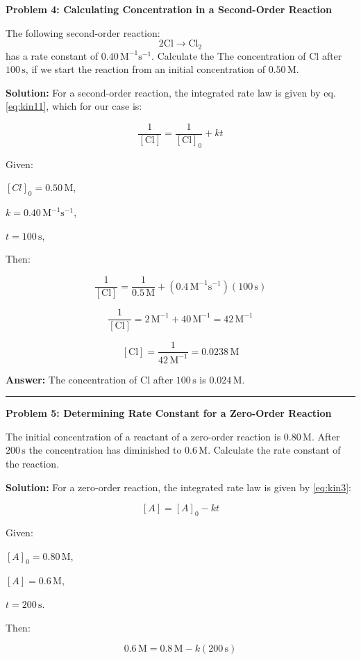 \documentclass[
  9pt,
]{extbook}
\theoremstyle{definition}
\theoremstyle{definition}
\theoremstyle{definition}
\theoremstyle{definition}
\theoremstyle{remark}
\begin{document}
\textbf{Problem 4: Calculating Concentration in a Second-Order Reaction}

The following second-order reaction:
\[2\text{Cl} \rightarrow \text{Cl}_2\]
has a rate constant of \(0.40\,\text{M}^{-1}\text{s}^{-1}\). Calculate the The concentration of \(\text{Cl}\) after \(100\,\text{s}\), if we start the reaction from an initial concentration of \(0.50\,\text{M}\).

\textbf{Solution:} For a second-order reaction, the integrated rate law is given by eq. \eqref{eq:kin11}, which for our case is:

\[\frac{1}{[\text{Cl}]} = \frac{1}{[\text{Cl}]_0} + kt\]

Given:

\([Cl]_0 = 0.50\,\text{M}\),

\(k = 0.40\,\text{M}^{-1}\text{s}^{-1}\),

\(t = 100\,\text{s}\),

Then:

\[\frac{1}{[\text{Cl}]} = \frac{1}{0.5\,\text{M}} + (0.4\,\text{M}^{-1}\text{s}^{-1})(100\,\text{s})\]

\[\frac{1}{[\text{Cl}]} = 2\,\text{M}^{-1} + 40\,\text{M}^{-1} = 42\,\text{M}^{-1}\]

\[[\text{Cl}] = \frac{1}{42\,\text{M}^{-1}} = 0.0238\,\text{M}\]

\textbf{Answer:} The concentration of \(\text{Cl}\) after \(100\,\text{s}\) is \(0.024\,\text{M}\).

\begin{center}\rule{0.5\linewidth}{0.5pt}\end{center}

\textbf{Problem 5: Determining Rate Constant for a Zero-Order Reaction}

The initial concentration of a reactant of a zero-order reaction is \(0.80\,\text{M}\). After \(200\,\text{s}\) the concentration has diminished to \(0.6\,\text{M}\). Calculate the rate constant of the reaction.

\textbf{Solution:} For a zero-order reaction, the integrated rate law is given by \eqref{eq:kin3}:

\[[A] = [A]_0 - kt\]

Given:

\([A]_0 = 0.80\,\text{M}\),

\([A] = 0.6\,\text{M}\),

\(t=200\,\text{s}\).

Then:

\[0.6\,\text{M} = 0.8\,\text{M} - k(200\,\text{s})\]
\end{document}
